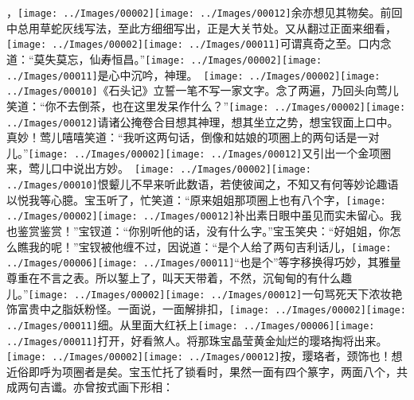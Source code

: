 ，{\texttt{[image: ../Images/00002]}\texttt{[image: ../Images/00012]}\footnotesize \kaishu 余亦想见其物矣。前回中总用草蛇灰线写法，至此方细细写出，正是大关节处。}又从翻过正面来细看，{\texttt{[image: ../Images/00002]}\texttt{[image: ../Images/00011]}\footnotesize \kaishu 可谓真奇之至。}口内念道：``莫失莫忘，仙寿恒昌。''{\texttt{[image: ../Images/00002]}\texttt{[image: ../Images/00011]}\footnotesize \kaishu 是心中沉吟，神理。　\texttt{[image: ../Images/00002]}\texttt{[image: ../Images/00010]}\footnotesize \kaishu 《石头记》立誓一笔不写一家文字。}念了两遍，乃回头向莺儿笑道：``你不去倒茶，也在这里发呆作什么？''{\texttt{[image: ../Images/00002]}\texttt{[image: ../Images/00012]}\footnotesize \kaishu 请诸公掩卷合目想其神理，想其坐立之势，想宝钗面上口中。真妙！}莺儿嘻嘻笑道：``我听这两句话，倒像和姑娘的项圈上的两句话是一对儿。''{\texttt{[image: ../Images/00002]}\texttt{[image: ../Images/00012]}\footnotesize \kaishu 又引出一个金项圈来，莺儿口中说出方妙。　\texttt{[image: ../Images/00002]}\texttt{[image: ../Images/00010]}\footnotesize \kaishu 恨颦儿不早来听此数语，若使彼闻之，不知又有何等妙论趣语以悦我等心臆。}宝玉听了，忙笑道：``原来姐姐那项圈上也有八个字，{\texttt{[image: ../Images/00002]}\texttt{[image: ../Images/00012]}\footnotesize \kaishu 补出素日眼中虽见而实未留心。}我也鉴赏鉴赏！''宝钗道：``你别听他的话，没有什么字。''宝玉笑央：``好姐姐，你怎么瞧我的呢！''宝钗被他缠不过，因说道：``是个人给了两句吉利话儿，{\texttt{[image: ../Images/00006]}\texttt{[image: ../Images/00011]}\footnotesize \kaishu ``也是个''等字移换得巧妙，其雅量尊重在不言之表。}所以錾上了，叫天天带着，不然，沉甸甸的有什么趣儿。''{\texttt{[image: ../Images/00002]}\texttt{[image: ../Images/00012]}\footnotesize \kaishu 一句骂死天下浓妆艳饰富贵中之脂妖粉怪。}一面说，一面解排扣，{\texttt{[image: ../Images/00002]}\texttt{[image: ../Images/00011]}\footnotesize \kaishu 细。}从里面大红袄上{\texttt{[image: ../Images/00006]}\texttt{[image: ../Images/00011]}\footnotesize \kaishu 打开，好看煞人。}将那珠宝晶莹黄金灿烂的璎珞掏将出来。{\texttt{[image: ../Images/00002]}\texttt{[image: ../Images/00012]}\footnotesize \kaishu 按，璎珞者，颈饰也！想近俗即呼为项圈者是矣。}宝玉忙托了锁看时，果然一面有四个篆字，两面八个，共成两句吉谶。亦曾按式画下形相：

